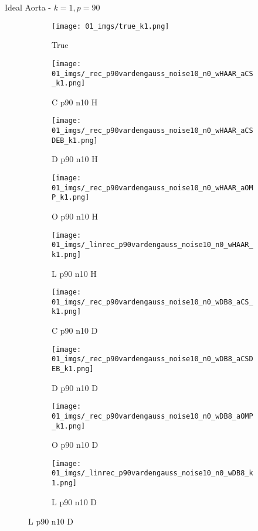 \begin{frame}{Ideal Aorta - $k=1,p=90$}{}
\begin{figure}
\begin{subfigure}{0.1\textwidth}
\texttt{[image: 01\_imgs/true\_k1.png]}
\caption*{\Tiny True}
\end{subfigure}
\begin{subfigure}{0.1\textwidth}
\texttt{[image: 01\_imgs/\_rec\_p90vardengauss\_noise10\_n0\_wHAAR\_aCS\_k1.png]}
\caption*{\Tiny C p90 n10 H}
\end{subfigure}
\begin{subfigure}{0.1\textwidth}
\texttt{[image: 01\_imgs/\_rec\_p90vardengauss\_noise10\_n0\_wHAAR\_aCSDEB\_k1.png]}
\caption*{\Tiny D p90 n10 H}
\end{subfigure}
\begin{subfigure}{0.1\textwidth}
\texttt{[image: 01\_imgs/\_rec\_p90vardengauss\_noise10\_n0\_wHAAR\_aOMP\_k1.png]}
\caption*{\Tiny O p90 n10 H}
\end{subfigure}
\begin{subfigure}{0.1\textwidth}
\texttt{[image: 01\_imgs/\_linrec\_p90vardengauss\_noise10\_n0\_wHAAR\_k1.png]}
\caption*{\Tiny L p90 n10 H}
\end{subfigure}
\begin{subfigure}{0.1\textwidth}
\texttt{[image: 01\_imgs/\_rec\_p90vardengauss\_noise10\_n0\_wDB8\_aCS\_k1.png]}
\caption*{\Tiny C p90 n10 D}
\end{subfigure}
\begin{subfigure}{0.1\textwidth}
\texttt{[image: 01\_imgs/\_rec\_p90vardengauss\_noise10\_n0\_wDB8\_aCSDEB\_k1.png]}
\caption*{\Tiny D p90 n10 D}
\end{subfigure}
\begin{subfigure}{0.1\textwidth}
\texttt{[image: 01\_imgs/\_rec\_p90vardengauss\_noise10\_n0\_wDB8\_aOMP\_k1.png]}
\caption*{\Tiny O p90 n10 D}
\end{subfigure}
\begin{subfigure}{0.1\textwidth}
\texttt{[image: 01\_imgs/\_linrec\_p90vardengauss\_noise10\_n0\_wDB8\_k1.png]}
\caption*{\Tiny L p90 n10 D}
\end{subfigure}
\vspace{5pt}


\end{figure}
\end{frame}
